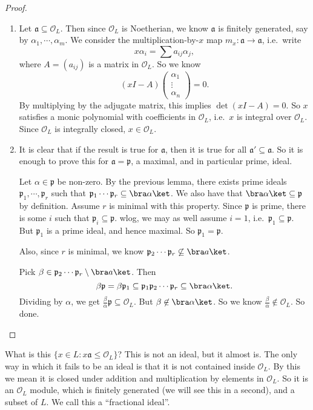 \documentclass[a4paper]{article}
\begin{document}
\begin{proof}\leavevmode
  \begin{enumerate}
    \item Let $\mathfrak{a} \subseteq \mathcal{O}_L$. Then since $\mathcal{O}_L$ is Noetherian, we know $\mathfrak{a}$ is finitely generated, say by $\alpha_1, \cdots, \alpha_m$. We consider the multiplication-by-$x$ map $m_x: \mathfrak{a} \to \mathfrak{a}$, i.e.\ write
      \[
        x\alpha_i = \sum a_{ij} \alpha_j,
      \]
      where $A = (a_{ij})$ is a matrix in $\mathcal{O}_L$. So we know
      \[
        (xI - A)
        \begin{pmatrix}
          \alpha_1\\\vdots\\ \alpha_n
        \end{pmatrix}
        = 0.
      \]
      By multiplying by the adjugate matrix, this implies $\det (xI - A) = 0$. So $x$ satisfies a monic polynomial with coefficients in $\mathcal{O}_L$, i.e.\ $x$ is integral over $\mathcal{O}_L$. Since $\mathcal{O}_L$ is integrally closed, $x \in \mathcal{O}_L$.

    \item It is clear that if the result is true for $\mathfrak{a}$, then it is true for all $\mathfrak{a}' \subseteq \mathfrak{a}$. So it is enough to prove this for $\mathfrak{a} = \mathfrak{p}$, a maximal, and in particular prime, ideal.

      Let $\alpha \in \mathfrak{p}$ be non-zero. By the previous lemma, there exists prime ideals $\mathfrak{p}_1, \cdots, \mathfrak{p}_r$ such that $\mathfrak{p}_1 \cdots \mathfrak{p}_r \subseteq \bra \alpha\ket$. We also have that $\bra \alpha\ket \subseteq \mathfrak{p}$ by definition. Assume $r$ is minimal with this property. Since $\mathfrak{p}$ is prime, there is some $i$ such that $\mathfrak{p}_i \subseteq \mathfrak{p}$. wlog, we may as well assume $i = 1$, i.e.\ $\mathfrak{p}_1 \subseteq \mathfrak{p}$. But $\mathfrak{p}_1$ is a prime ideal, and hence maximal. So $\mathfrak{p}_1 = \mathfrak{p}$.

      Also, since $r$ is minimal, we know $\mathfrak{p}_2 \cdots \mathfrak{p}_r \not\subseteq \bra a\ket$.

      Pick $\beta \in \mathfrak{p}_2 \cdots \mathfrak{p}_r \setminus \bra a\ket$. Then
      \[
        \beta \mathfrak{p} = \beta \mathfrak{p}_1 \subseteq \mathfrak{p}_1 \mathfrak{p}_2 \cdots \mathfrak{p}_r \subseteq \bra \alpha\ket.
      \]
      Dividing by $\alpha$, we get $\frac{\beta}{\alpha}\mathfrak{p} \subseteq \mathcal{O}_L$. But $\beta \not\in \bra \alpha\ket$. So we know $\frac{\beta}{\alpha} \not\in \mathcal{O}_L$. So done.
  \end{enumerate}
\end{proof}
What is this $\{x \in L: x \mathfrak{a} \leq \mathcal{O}_L\}$? This is not an ideal, but it almost is. The only way in which it fails to be an ideal is that it is not contained inside $\mathcal{O}_L$. By this we mean it is closed under addition and multiplication by elements in $\mathcal{O}_L$. So it is an $\mathcal{O}_L$ module, which is finitely generated (we will see this in a second), and a subset of $L$. We call this a ``fractional ideal''.
\end{document}
